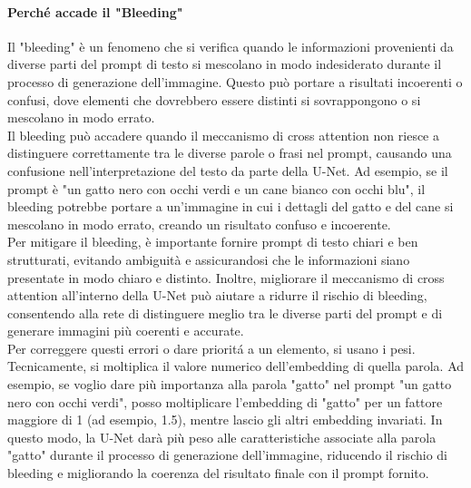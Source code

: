 \paragraph{Perché accade il "Bleeding"}
Il "bleeding" è un fenomeno che si verifica quando le informazioni provenienti da diverse parti del prompt di testo si mescolano in modo indesiderato durante il processo di generazione dell'immagine. Questo può portare a risultati incoerenti o confusi, dove elementi che dovrebbero essere distinti si sovrappongono o si mescolano in modo errato.\\
Il bleeding può accadere quando il meccanismo di cross attention non riesce a distinguere correttamente tra le diverse parole o frasi nel prompt, causando una confusione nell'interpretazione del testo da parte della U-Net. Ad esempio, se il prompt è "un gatto nero con occhi verdi e un cane bianco con occhi blu", il bleeding potrebbe portare a un'immagine in cui i dettagli del gatto e del cane si mescolano in modo errato, creando un risultato confuso e incoerente.\\
Per mitigare il bleeding, è importante fornire prompt di testo chiari e ben strutturati, evitando ambiguità e assicurandosi che le informazioni siano presentate in modo chiaro e distinto. Inoltre, migliorare il meccanismo di cross attention all'interno della U-Net può aiutare a ridurre il rischio di bleeding, consentendo alla rete di distinguere meglio tra le diverse parti del prompt e di generare immagini più coerenti e accurate.\\

Per correggere questi errori o dare prioritá a un elemento, si usano i pesi. Tecnicamente, si moltiplica il valore numerico dell'embedding di quella parola. Ad esempio, se voglio dare più importanza alla parola "gatto" nel prompt "un gatto nero con occhi verdi", posso moltiplicare l'embedding di "gatto" per un fattore maggiore di 1 (ad esempio, 1.5), mentre lascio gli altri embedding invariati. In questo modo, la U-Net darà più peso alle caratteristiche associate alla parola "gatto" durante il processo di generazione dell'immagine, riducendo il rischio di bleeding e migliorando la coerenza del risultato finale con il prompt fornito.\\

